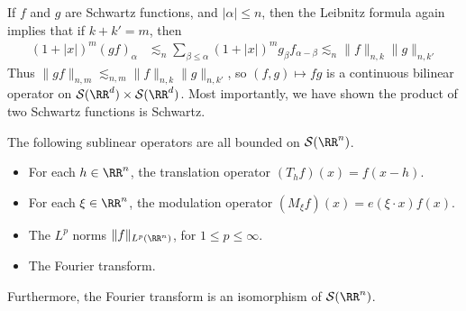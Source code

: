 If $f$ and $g$ are Schwartz functions, and $|\alpha| \leq n$, then the Leibnitz formula again implies that if $k + k' = m$, then
%
\begin{align*}
    (1 + |x|)^m (gf)_\alpha &\lesssim_n \sum_{\beta \leq \alpha} (1 + |x|)^m g_\beta f_{\alpha - \beta} \lesssim_n \| f \|_{n,k} \| g \|_{n,k'}
\end{align*}
%
Thus $\| gf \|_{n,m} \lesssim_{n,m} \| f \|_{n,k} \| g \|_{n,k'}$, so $(f,g) \mapsto fg$ is a continuous bilinear operator on $\mathcal{S}(\RR^d) \times \mathcal{S}(\RR^d)$. Most importantly, we have shown the product of two Schwartz functions is Schwartz.

\begin{theorem}
    The following sublinear operators are all bounded on $\mathcal{S}(\RR^n)$.
    \begin{itemize}
        \item For each $h \in \RR^n$, the translation operator $(T_h f)(x) = f(x - h)$.

        \item For each $\xi \in \RR^n$, the modulation operator $(M_\xi f)(x) = e(\xi \cdot x) f(x)$.

        \item The $L^p$ norms $\| f \|_{L^p(\RR^n)}$, for $1 \leq p \leq \infty$.

        \item The Fourier transform.
    \end{itemize}
    Furthermore, the Fourier transform is an isomorphism of $\mathcal{S}(\RR^n)$.
\end{theorem}
